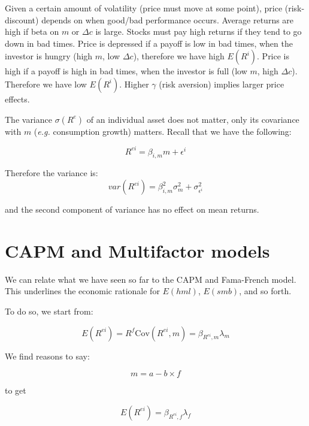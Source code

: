 Given a certain amount of volatility (price must move at some point),
price (risk-discount) depends on when good/bad performance occurs.
Average returns are high if beta on $m$ or $\Delta c$ is large.
Stocks must pay high returns if they tend to go down 
in bad times. Price is depressed if a payoff is low in 
bad times, when the investor is hungry (high $m$, low $\Delta c$), 
therefore we have high $E(R^i)$.
Price is high if a payoff is high in bad times, when the investor
is full (low $m$, high $\Delta c$). Therefore we have low $E(R^i)$.
Higher $\gamma$ (risk aversion) implies larger price effects.

The variance $\sigma(R^e)$ of an individual asset 
does not matter, only its covariance with $m$ (\textit{e.g.} consumption growth)
matters. Recall that we have the following:

\begin{equation}
    R^{ei} = \beta_{i,m} m + \epsilon^i 
\end{equation}

Therefore the variance is:
\begin{equation}
    var(R^{ei}) = \beta^2_{i,m} \sigma^2_{m} + \sigma_{\epsilon^i}^2
\end{equation}

and the second component of variance has no effect on mean returns.

\section{CAPM and Multifactor models}

We can relate what we have seen so far to the CAPM and Fama-French model. 
This underlines the economic rationale for $E(hml)$, $E(smb)$, and so forth.

To do so, we start from:

\begin{equation}
    E(R^{ei}) = R^f \text{Cov}(R^{ei}, m) = \beta_{R^{ei}, m} \lambda_m
\end{equation}

We find reasons to say:

\begin{equation}
    m = a -b \times f 
\end{equation}

to get 

\begin{equation}
    E(R^{ei}) = \beta_{R^{ei}, f} \lambda_f
\end{equation}


